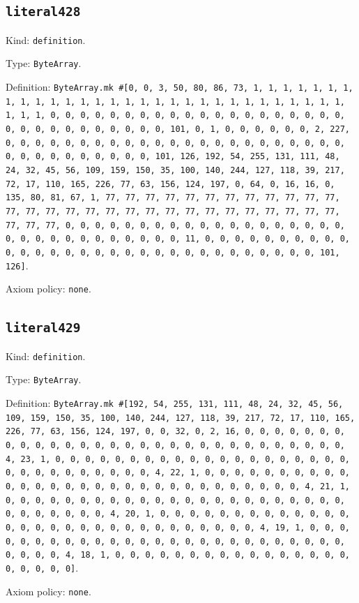 \documentclass[11pt]{article}
\begin{document}
\subsection*{\texttt{literal428}}
\noindent Kind: \texttt{definition}.\par
\noindent Type: \texttt{ByteArray}.\par
\noindent Definition: \texttt{ByteArray.mk \#[0, 0, 3, 50, 80, 86, 73, 1, 1, 1, 1, 1, 1, 1, 1, 1, 1, 1, 1, 1, 1, 1, 1, 1, 1, 1, 1, 1, 1, 1, 1, 1, 1, 1, 1, 1, 1, 1, 1, 1, 0, 0, 0, 0, 0, 0, 0, 0, 0, 0, 0, 0, 0, 0, 0, 0, 0, 0, 0, 0, 0, 0, 0, 0, 0, 0, 0, 0, 0, 0, 0, 101, 0, 1, 0, 0, 0, 0, 0, 0, 2, 227, 0, 0, 0, 0, 0, 0, 0, 0, 0, 0, 0, 0, 0, 0, 0, 0, 0, 0, 0, 0, 0, 0, 0, 0, 0, 0, 0, 0, 0, 0, 0, 0, 0, 101, 126, 192, 54, 255, 131, 111, 48, 24, 32, 45, 56, 109, 159, 150, 35, 100, 140, 244, 127, 118, 39, 217, 72, 17, 110, 165, 226, 77, 63, 156, 124, 197, 0, 64, 0, 16, 16, 0, 135, 80, 81, 67, 1, 77, 77, 77, 77, 77, 77, 77, 77, 77, 77, 77, 77, 77, 77, 77, 77, 77, 77, 77, 77, 77, 77, 77, 77, 77, 77, 77, 77, 77, 77, 77, 77, 0, 0, 0, 0, 0, 0, 0, 0, 0, 0, 0, 0, 0, 0, 0, 0, 0, 0, 0, 0, 0, 0, 0, 0, 0, 0, 0, 0, 0, 0, 0, 11, 0, 0, 0, 0, 0, 0, 0, 0, 0, 0, 0, 0, 0, 0, 0, 0, 0, 0, 0, 0, 0, 0, 0, 0, 0, 0, 0, 0, 0, 0, 0, 101, 126]}.\par
\noindent Axiom policy: \texttt{none}.\par
\subsection*{\texttt{literal429}}
\noindent Kind: \texttt{definition}.\par
\noindent Type: \texttt{ByteArray}.\par
\noindent Definition: \texttt{ByteArray.mk \#[192, 54, 255, 131, 111, 48, 24, 32, 45, 56, 109, 159, 150, 35, 100, 140, 244, 127, 118, 39, 217, 72, 17, 110, 165, 226, 77, 63, 156, 124, 197, 0, 0, 32, 0, 2, 16, 0, 0, 0, 0, 0, 0, 0, 0, 0, 0, 0, 0, 0, 0, 0, 0, 0, 0, 0, 0, 0, 0, 0, 0, 0, 0, 0, 0, 0, 0, 4, 23, 1, 0, 0, 0, 0, 0, 0, 0, 0, 0, 0, 0, 0, 0, 0, 0, 0, 0, 0, 0, 0, 0, 0, 0, 0, 0, 0, 0, 0, 0, 0, 4, 22, 1, 0, 0, 0, 0, 0, 0, 0, 0, 0, 0, 0, 0, 0, 0, 0, 0, 0, 0, 0, 0, 0, 0, 0, 0, 0, 0, 0, 0, 0, 0, 4, 21, 1, 0, 0, 0, 0, 0, 0, 0, 0, 0, 0, 0, 0, 0, 0, 0, 0, 0, 0, 0, 0, 0, 0, 0, 0, 0, 0, 0, 0, 0, 0, 4, 20, 1, 0, 0, 0, 0, 0, 0, 0, 0, 0, 0, 0, 0, 0, 0, 0, 0, 0, 0, 0, 0, 0, 0, 0, 0, 0, 0, 0, 0, 0, 0, 4, 19, 1, 0, 0, 0, 0, 0, 0, 0, 0, 0, 0, 0, 0, 0, 0, 0, 0, 0, 0, 0, 0, 0, 0, 0, 0, 0, 0, 0, 0, 0, 0, 4, 18, 1, 0, 0, 0, 0, 0, 0, 0, 0, 0, 0, 0, 0, 0, 0, 0, 0, 0, 0, 0, 0, 0]}.\par
\noindent Axiom policy: \texttt{none}.\par
\end{document}
